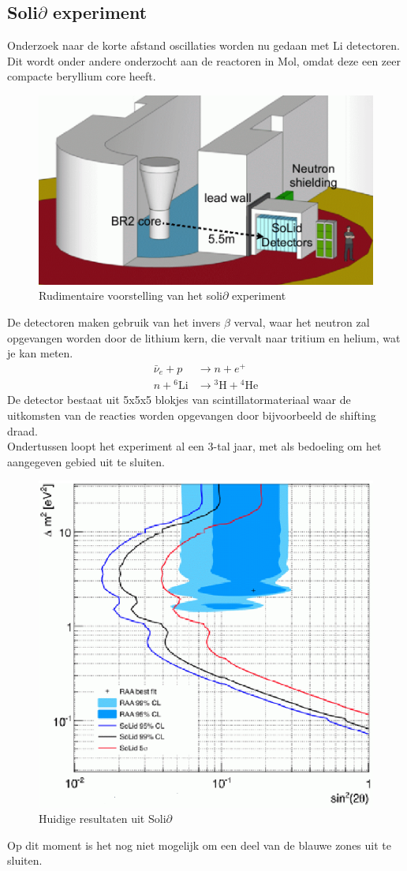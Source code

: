 \documentclass[../main.tex]{subfiles}
\begin{document}
\subsection{Soli$\partial$ experiment}%
\label{sub:soli_partial_experiment}

Onderzoek naar de korte afstand oscillaties worden nu gedaan met Li detectoren. Dit wordt onder andere onderzocht aan de reactoren in Mol, omdat deze een zeer compacte beryllium core heeft.

\begin{figure}[h]
    \centering
    \includegraphics[width=0.3\linewidth]{neutrinos/voorstelling_solid_experiment.png}
    \caption{Rudimentaire voorstelling van het soli$\partial$ experiment}%
    \label{fig:neutrinos/voorstelling_solid_experiment}
\end{figure}

De detectoren maken gebruik van het invers $\beta$ verval, waar het neutron zal opgevangen worden door de lithium kern, die vervalt naar tritium en helium, wat je kan meten.
\begin{equation}
    \begin{aligned}
        \label{eq:li_det_interactie}
        \bar{\nu}_{e}+p &\rightarrow n+e^{+}\\
        n+{ }^{6} \mathrm{Li} &\rightarrow{ }^{3} \mathrm{H}+{ }^{4} \mathrm{He}
    \end{aligned}
\end{equation}
De detector bestaat uit 5x5x5 blokjes van scintillatormateriaal waar de uitkomsten van de reacties worden opgevangen door bijvoorbeeld de shifting draad.\\
Ondertussen loopt het experiment al een 3-tal jaar, met als bedoeling om het aangegeven gebied uit te sluiten.
\begin{figure}[h]
    \centering
    \includegraphics[width=0.5\linewidth]{neutrinos/solid_resultaten.png}
    \caption{Huidige resultaten uit Soli$\partial$}%
    \label{fig:neutrinos/solid_resultaten}
\end{figure}
Op dit moment is het nog niet mogelijk om een deel van de blauwe zones uit te sluiten.
\end{document}

